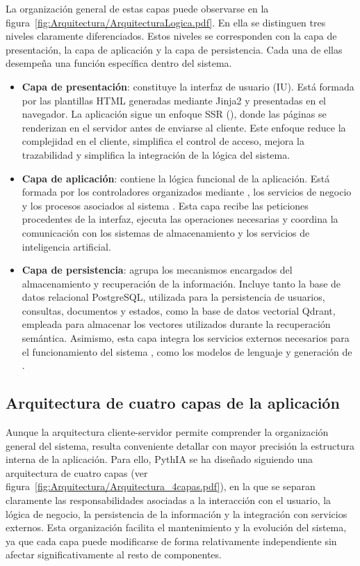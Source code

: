 La organización general de estas capas puede observarse en la figura~\ref{fig:Arquitectura/ArquitecturaLogica.pdf}. En ella se distinguen tres niveles claramente diferenciados. Estos niveles se corresponden con la capa de presentación, la capa de aplicación y la capa de persistencia. Cada una de ellas desempeña una función específica dentro del sistema. 


\begin{itemize}
	\item \textbf{Capa de presentación}: constituye la interfaz de usuario (IU). Está formada por las plantillas HTML generadas mediante Jinja2 y presentadas en el navegador. La aplicación sigue un enfoque SSR (), donde las páginas se renderizan en el servidor antes de enviarse al cliente. Este enfoque reduce la complejidad en el cliente, simplifica el control de acceso, mejora la trazabilidad y simplifica la integración de la lógica del sistema.
	\item \textbf{Capa de aplicación}: contiene la lógica funcional de la aplicación. Está formada por los controladores organizados mediante , los servicios de negocio y los procesos asociados al sistema . Esta capa recibe las peticiones procedentes de la interfaz, ejecuta las operaciones necesarias y coordina la comunicación con los sistemas de almacenamiento y los servicios de inteligencia artificial.
	\item \textbf{Capa de persistencia}: agrupa los mecanismos encargados del almacenamiento y recuperación de la información. Incluye tanto la base de datos relacional PostgreSQL, utilizada para la persistencia de usuarios, consultas, documentos y estados, como la base de datos vectorial Qdrant, empleada para almacenar los vectores utilizados durante la recuperación semántica. Asimismo, esta capa integra los servicios externos necesarios para el funcionamiento del sistema , como los modelos de lenguaje y generación de .	
\end{itemize}

\subsection{Arquitectura de cuatro capas de la aplicación}

Aunque la arquitectura cliente-servidor permite comprender la organización general del sistema, resulta conveniente detallar con mayor precisión la estructura interna de la aplicación. Para ello, PythIA se ha diseñado siguiendo una arquitectura de cuatro capas (ver figura~\ref{fig:Arquitectura/Arquitectura_4capas.pdf}), en la que se separan claramente las responsabilidades asociadas a la interacción con el usuario, la lógica de negocio, la persistencia de la información y la integración con servicios externos. Esta organización facilita el mantenimiento y la evolución del sistema, ya que cada capa puede modificarse de forma relativamente independiente sin afectar significativamente al resto de componentes.

